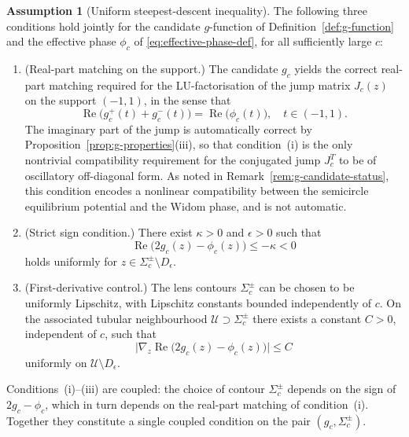 \documentclass[12pt,a4paper]{amsart}
\theoremstyle{definition}
\newtheorem{assumption}[theorem]{Assumption}
\theoremstyle{remark}
\begin{document}
\begin{assumption}[Uniform steepest-descent inequality]
\label{ass:g-sign}
The following three conditions hold jointly for the candidate
$g$-function of Definition~\ref{def:g-function} and the effective
phase $\phi_c$ of \eqref{eq:effective-phase-def}, for all sufficiently
large $c$:

\begin{enumerate}[label=(\roman*)]
\item \textup{(Real-part matching on the support.)}
The candidate $g_c$ yields the correct real-part matching required
for the LU-factorisation of the jump matrix $J_c(z)$ on the support
$(-1,1)$, in the sense that
\[
  \operatorname{Re}\!\bigl(g_c^+(t) + g_c^-(t)\bigr)
  = \operatorname{Re}\!\bigl(\phi_c(t)\bigr),
  \quad t \in (-1,1).
\]
The imaginary part of the jump is automatically correct by
Proposition~\ref{prop:g-properties}(iii), so that condition~(i)
is the only nontrivial compatibility requirement for the
conjugated jump $J_c^T$ to be of oscillatory off-diagonal form.
As noted in Remark~\ref{rem:g-candidate-status}, this condition
encodes a nonlinear compatibility between the semicircle equilibrium
potential and the Widom phase, and is not automatic.

\item \textup{(Strict sign condition.)}
There exist $\kappa > 0$ and $\epsilon > 0$ such that
\[
  \operatorname{Re}\!\bigl(2g_c(z) - \phi_c(z)\bigr)
  \le -\kappa < 0
\]
holds uniformly for $z \in \Sigma_c^\pm \setminus D_\epsilon$.

\item \textup{(First-derivative control.)}
The lens contours $\Sigma_c^\pm$ can be chosen to be uniformly
Lipschitz, with Lipschitz constants bounded independently of $c$.
On the associated tubular neighbourhood
$\mathcal{U} \supset \Sigma_c^\pm$ there exists a constant $C > 0$,
independent of $c$, such that
\[
  \bigl|\nabla_z \operatorname{Re}\!\bigl(2g_c(z) - \phi_c(z)\bigr)\bigr|
  \le C
\]
uniformly on $\mathcal{U} \setminus D_\epsilon$.
\end{enumerate}

Conditions~(i)--(iii) are coupled: the choice of contour
$\Sigma_c^\pm$ depends on the sign of $2g_c - \phi_c$,
which in turn depends on the real-part matching of condition~(i).
Together they constitute a single coupled condition on the pair
$(g_c, \Sigma_c^\pm)$.
\end{assumption}
\end{document}
